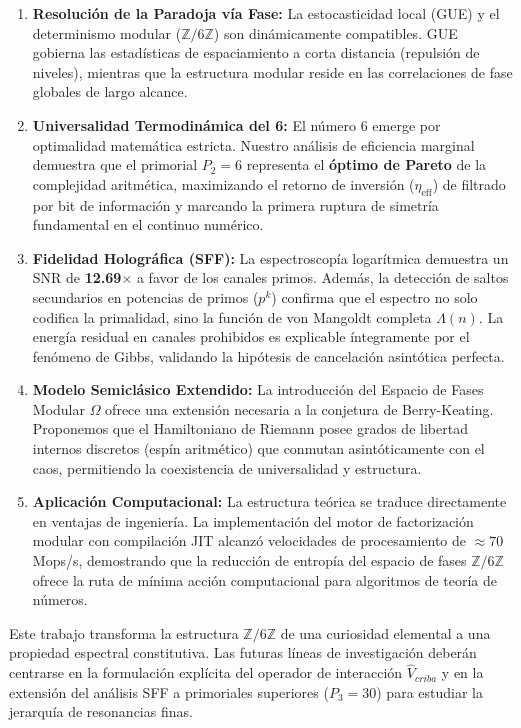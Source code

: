 \documentclass[12pt, a4paper]{article}
\theoremstyle{plain}
\theoremstyle{definition}
\newcommand{\Z}{\mathbb{Z}}
\begin{document}
\begin{enumerate}
    \item \textbf{Resolución de la Paradoja vía Fase:} La estocasticidad local (GUE) y el determinismo modular ($\Z/6\Z$) son dinámicamente compatibles. GUE gobierna las estadísticas de espaciamiento a corta distancia (repulsión de niveles), mientras que la estructura modular reside en las correlaciones de fase globales de largo alcance.
    
    \item \textbf{Universalidad Termodinámica del 6:} El número 6 emerge por optimalidad matemática estricta. Nuestro análisis de eficiencia marginal demuestra que el primorial $P_2=6$ representa el \textbf{óptimo de Pareto} de la complejidad aritmética, maximizando el retorno de inversión ($\eta_{\text{eff}}$) de filtrado por bit de información y marcando la primera ruptura de simetría fundamental en el continuo numérico.
    
    \item \textbf{Fidelidad Holográfica (SFF):} La espectroscopía logarítmica demuestra un SNR de \textbf{12.69$\times$} a favor de los canales primos. Además, la detección de saltos secundarios en potencias de primos ($p^k$) confirma que el espectro no solo codifica la primalidad, sino la función de von Mangoldt completa $\Lambda(n)$. La energía residual en canales prohibidos es explicable íntegramente por el fenómeno de Gibbs, validando la hipótesis de cancelación asintótica perfecta.
    
    \item \textbf{Modelo Semiclásico Extendido:} La introducción del Espacio de Fases Modular $\Omega$ ofrece una extensión necesaria a la conjetura de Berry-Keating. Proponemos que el Hamiltoniano de Riemann posee grados de libertad internos discretos (espín aritmético) que conmutan asintóticamente con el caos, permitiendo la coexistencia de universalidad y estructura.

    \item \textbf{Aplicación Computacional:} La estructura teórica se traduce directamente en ventajas de ingeniería. La implementación del motor de factorización modular con compilación JIT alcanzó velocidades de procesamiento de $\approx 70$ Mops/s, demostrando que la reducción de entropía del espacio de fases $\Z/6\Z$ ofrece la ruta de mínima acción computacional para algoritmos de teoría de números.
\end{enumerate}

Este trabajo transforma la estructura $\Z/6\Z$ de una curiosidad elemental a una propiedad espectral constitutiva. Las futuras líneas de investigación deberán centrarse en la formulación explícita del operador de interacción $\hat{V}_{criba}$ y en la extensión del análisis SFF a primoriales superiores ($P_3=30$) para estudiar la jerarquía de resonancias finas.
\end{document}
